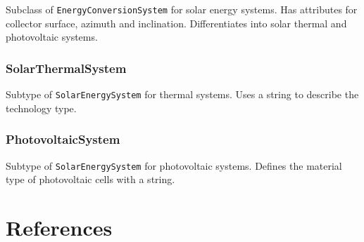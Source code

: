 \documentclass[a4paper,12pt]{article}
\let\stdsection\section%
\renewcommand\section{\newpage\stdsection}
\begin{document}
Subclass of \texttt{EnergyConversionSystem} for solar energy systems.
Has attributes for collector surface, azimuth and inclination.
Differentiates into solar thermal and photovoltaic systems.

\subsubsection{SolarThermalSystem}\label{solarthermalsystem}

Subtype of \texttt{SolarEnergySystem} for thermal systems. Uses a string
to describe the technology type.

\subsubsection{PhotovoltaicSystem}\label{photovoltaicsystem}

Subtype of \texttt{SolarEnergySystem} for photovoltaic systems. Defines
the material type of photovoltaic cells with a string.

\section*{References}\label{references}

\hypertarget{refs}{}
\end{document}
